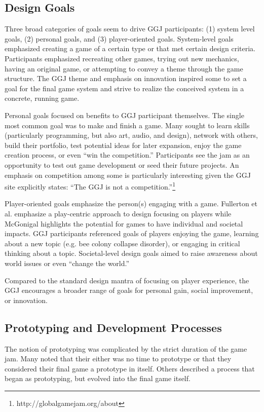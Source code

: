 \documentclass{sig-alternate}
\begin{document}
\subsection{Design Goals}
Three broad categories of goals seem to drive GGJ participants: (1) system level goals, (2) personal goals, and (3) player-oriented goals.
System-level goals emphasized creating a game of a certain type or that met certain design criteria. Participants emphasized recreating other games, trying out new mechanics, having an original game, or attempting to convey a theme through the game structure. The GGJ theme and emphasis on innovation inspired some to set a goal for the final game system and strive to realize the conceived system in a concrete, running game.

Personal goals focused on benefits to GGJ participant themselves. 
The single most common goal  was to make and finish a game. 
Many sought to learn skills (particularly programming, but also art, audio, and design), network with others, build their portfolio, test potential ideas for later expansion, enjoy the game creation process, or even ``win the competition.'' Participants see the jam as an opportunity to test out game development or seed their future projects. An emphasis on competition among some is particularly interesting given the GGJ site explicitly states: ``The GGJ is not a competition.''\footnote{http://globalgamejam.org/about}

Player-oriented goals emphasize the person(s) engaging with a game. Fullerton et al. \cite{fullerton2008:playcentric} emphasize a play-centric approach to design focusing on players while McGonigal \cite{mcgonigal2011:realitybroken} highlights the potential for games to have individual and societal impacts.
GGJ participants referenced goals of players enjoying the game, learning about a new topic (e.g. bee colony collapse disorder), or engaging in critical thinking about a topic. Societal-level design goals aimed to raise awareness about world issues or even ``change the world.''

Compared to the standard design mantra of focusing on player experience, the GGJ encourages a broader range of goals for personal gain, social improvement, or innovation. 


\subsection{Prototyping and Development Processes}
The notion of prototyping was complicated by the strict duration of the game jam. Many noted that their either was no time to prototype or that they considered their final game a prototype in itself. Others described a process that began as prototyping, but evolved into the final game itself.
\end{document}
